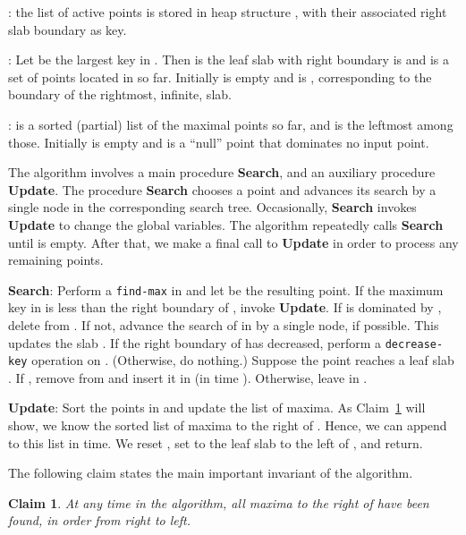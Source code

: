 \documentclass[letterpaper,11pt]{article}
\newtheorem{claim}[theorem]{Claim}
\newcommand{\findmax}{\texttt{find-max}}
\newcommand{\deckey}{\texttt{decrease-key}}
\begin{document}
\begin{asparaenum}
  \item : the list  of 
    active points is stored in 
    heap structure , with
    their associated right slab boundary as key.
  \item : Let  be the largest 
     key in . Then  is the leaf slab 
     with right boundary is  and
      is a set of points located in 
     so far. Initially  is empty and  is , 
     corresponding to the  boundary of the 
     rightmost, infinite, slab.
  \item :  is a sorted (partial) list 
    of the maximal points so far,
    and  is the leftmost among those. 
    Initially  is empty and  is a 
    ``null'' point that dominates no input point.
\end{asparaenum}

The algorithm involves a main 
procedure \textbf{Search}, and an 
auxiliary procedure
\textbf{Update}. The procedure \textbf{Search} 
chooses a point and advances
its search by a single node in the corresponding
search tree. Occasionally, \textbf{Search} invokes 
\textbf{Update} to change the global variables. 
The algorithm repeatedly calls \textbf{Search}
until  is empty. 
After that, we make a final call to 
\textbf{Update} in order to
process any remaining points.

\noindent
\textbf{Search}:  
Perform a \findmax{} in 
and let  be the resulting
point.
If the maximum key  in  is 
less than the right 
boundary of , 
invoke \textbf{Update}. 
If  is dominated by , 
delete  from .
If not, advance 
the search of  in  by 
a single node, if possible. 
This updates the slab . If 
the right boundary of  has 
decreased, perform a 
\deckey{} operation on . 
(Otherwise, do nothing.)
Suppose the point  reaches 
a leaf slab .  If 
, 
remove  from  and insert it
in  (in time ). Otherwise, 
leave  in .

	
\noindent
\textbf{Update}: 
Sort the points in  and update 
the list of maxima.
As Claim~\ref{clm:order} will show, we 
know the sorted list of maxima to 
the right of .  Hence, 
we can append to this list in 
time. We reset ,
set  to the leaf 
slab to the left of , and return.


The following claim states the main 
important invariant of the algorithm.

\begin{claim}\label{clm:order} 
  At any time in the algorithm, all 
  maxima to the right of  have 
  been found, in order from right to left.
\end{claim}
\end{document}
